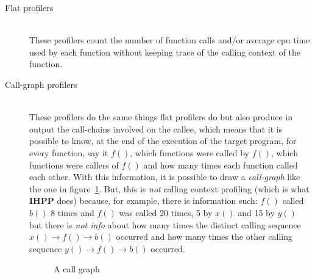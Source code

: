 \documentclass[a4paper,11pt]{report}
\begin{document}
\begin{description}
\item[Flat profilers] \hfill \\
These profilers count the number of function calls and/or average cpu time used
by each function without keeping trace of the calling context of the function.
\item[Call-graph profilers] \hfill \\
These profilers do the same things flat profilers do but also produce in output
the call-chains involved on the callee, which means that it is possible to know,
at the end of the execution of the target program, for every function, say it
$f()$, which functions were called by $f()$, which functions were
callers of $f()$ and how many times each function called each other. With this
information, it is possible to draw a
\emph{call-graph} like the one in figure~\ref{callgraph1}. But, this is
\emph{not} calling context profiling (which is what \textbf{IHPP} does) because,
for example, there is information such: $f()$ called $b()$ 8 times and $f()$ was called 20
times, 5 by $x()$ and 15 by $y()$ but there is \emph{not info} about how many times the
distinct calling sequence $x()\rightarrow f()\rightarrow b()$ occurred and how
many times the other calling sequence $y()\rightarrow f()\rightarrow b()$
occurred.

\begin{figure}

\begin{center}


\end{center}

\caption{A call graph}
\label{callgraph1}

\end{figure}



\end{description}
\end{document}

